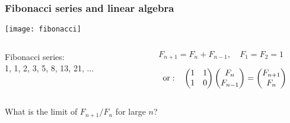 \begin{frame}[fragile]\frametitle{Fibonacci series and linear algebra}
 \begin{center}
  \texttt{[image: fibonacci]}
 \end{center}

 \vspace{-0.3truecm}
 \begin{columns}[c]
  \begin{column}{0.5\linewidth}
   Fibonacci series:\\ 1, 1, 2, 3, 5, 8, 13, 21, ...
  \end{column}%
  \begin{column}{0.5\linewidth}
   \begin{displaymath}
    F_{n+1} = F_n + F_{n-1},\quad F_1 = F_2 = 1
   \end{displaymath}

   \vspace{-0.8truecm}
   \begin{displaymath}
    \strut\quad\mathrm{or:}\quad
    \begin{pmatrix} 1 & 1 \\ 1 & 0 \end{pmatrix} 
    \begin{pmatrix} F_n \\ F_{n-1} \end{pmatrix} =
    \begin{pmatrix} F_{n+1} \\ F_n \end{pmatrix}
   \end{displaymath}
  \end{column}
 \end{columns}

 \begin{center}
  What is the limit of $F_{n+1}/F_n$ for large $n$?
 \end{center}
\end{frame}

